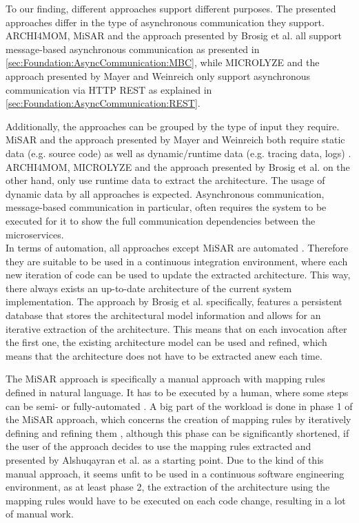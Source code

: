 To our finding, different approaches support different purposes.
The presented approaches differ in the type of asynchronous communication they support.
ARCHI4MOM, MiSAR and the approach presented by Brosig et al. all support message-based asynchronous communication as presented in \autoref{sec:Foundation:AsyncCommunication:MBC}, while MICROLYZE and the approach presented by Mayer and Weinreich only support asynchronous communication via HTTP REST as explained in \autoref{sec:Foundation:AsyncCommunication:REST}.

Additionally, the approaches can be grouped by the type of input they require.
MiSAR and the approach presented by Mayer and Weinreich both require static data (e.g. source code) as well as dynamic/runtime data (e.g. tracing data, logs) \cite{Alshuqayran2018MiSAR,Mayer2018}. \\
ARCHI4MOM, MICROLYZE and the approach presented by Brosig et al. on the other hand, only use runtime data to extract the architecture.
The usage of dynamic data by all approaches is expected.
Asynchronous communication, message-based communication in particular, often requires the system to be executed for it to show the full communication dependencies between the microservices.
\\

In terms of automation, all approaches except MiSAR are automated \cite{Alshuqayran2018MiSAR,Singh2022ARCHI4MOM,Brosig2011,Mayer2018,Kleehaus2018}.
Therefore they are suitable to be used in a continuous integration environment, where each new iteration of code can be used to update the extracted architecture.
This way, there always exists an up-to-date architecture of the current system implementation.
The approach by Brosig et al. specifically, features a persistent database that stores the architectural model information \cite{Brosig2011} and allows for an iterative extraction of the architecture.
This means that on each invocation after the first one, the existing architecture model can be used and refined, which means that the architecture does not have to be extracted anew each time.

The MiSAR approach is specifically a manual approach with mapping rules defined in natural language.
It has to be executed by a human, where some steps can be semi- or fully-automated \cite{Alshuqayran2020Thesis}.
A big part of the workload is done in phase 1 of the MiSAR approach, which concerns the creation of mapping rules by iteratively defining and refining them \cite{Alshuqayran2018MiSAR}, although this phase can be significantly shortened, if the user of the approach decides to use the mapping rules extracted and presented by Alshuqayran et al. as a starting point.
Due to the kind of this manual approach, it seems unfit to be used in a continuous software engineering environment, as at least phase 2, the extraction of the architecture using the mapping rules would have to be executed on each code change, resulting in a lot of manual work.
\\

